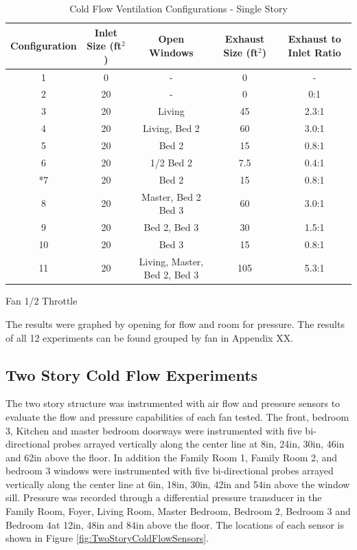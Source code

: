 \documentclass{article}
\begin{document}
\begin{table} [H]
	\caption{Cold Flow Ventilation Configurations - Single Story}
	\begin{tabular}{|c|c|c|c|c|}
		\hline
		Configuration & Inlet Size (ft$^2$) & Open Windows & Exhaust Size (ft$^2$) & Exhaust to Inlet Ratio \\ \hline \hline
		1 & 0 & - & 0 & - \\ \hline
		2 & 20 & - & 0 & 0:1 \\ \hline
		3 & 20 & Living & 45 & 2.3:1 \\ \hline
		4 & 20 & Living, Bed 2 & 60 & 3.0:1 \\ \hline
		5 & 20 & Bed 2 & 15 & 0.8:1 \\ \hline
		6 & 20 & 1/2 Bed 2 & 7.5 & 0.4:1 \\ \hline
		*7 & 20 & Bed 2 & 15 & 0.8:1 \\ \hline
		8 & 20 & Master, Bed 2 Bed 3 & 60 & 3.0:1 \\ \hline
		9 & 20 & Bed 2, Bed 3 & 30 & 1.5:1 \\ \hline
		10 & 20 & Bed 3 & 15 & 0.8:1 \\ \hline
		11 & 20 & Living, Master, Bed 2, Bed 3 & 105 & 5.3:1 \\ \hline
	\end{tabular}
	\begin{tablenotes}
		\item *Fan 1/2 Throttle
	\end{tablenotes}
	\label{tab:ColdFlowConfig_SingleStory}
\end{table}


The results were graphed by opening for flow and room for pressure. The results of all 12 experiments can be found grouped by fan in Appendix XX. 

\subsection{Two Story Cold Flow Experiments}
The two story structure was instrumented with air flow and pressure sensors to evaluate the flow and pressure capabilities of each fan tested. The front, bedroom 3, Kitchen and master bedroom doorways were instrumented with five bi-directional probes arrayed vertically along the center line at 8in, 24in, 30in, 46in and 62in above the floor. In addition the Family Room 1, Family Room 2, and bedroom 3 windows were instrumented with five bi-directional probes arrayed vertically along the center line at 6in, 18in, 30in, 42in and 54in above the window sill. Pressure was recorded through a differential pressure transducer in the Family Room, Foyer, Living Room, Master Bedroom, Bedroom 2, Bedroom 3 and Bedroom 4at 12in, 48in and 84in above the floor. The locations of each sensor is shown in Figure \ref{fig:TwoStoryColdFlowSensors}. 
\end{document}
